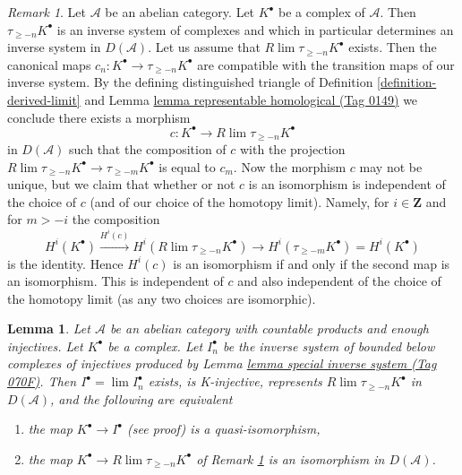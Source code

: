 \documentclass{amsart}
\theoremstyle{plain}
\newtheorem{lemma}[subsection]{Lemma}
\theoremstyle{definition}
\theoremstyle{remark}
\newtheorem{remark}[subsection]{Remark}
\numberwithin{equation}{subsection}
\def\lim{\mathop{\mathrm{lim}}\nolimits}
\begin{document}
\begin{remark}
\label{remark-map-into-derived-limit-truncations}
Let $\mathcal{A}$ be an abelian category. Let $K^\bullet$ be a
complex of $\mathcal{A}$. Then $\tau_{\geq -n}K^\bullet$ is an
inverse system of complexes and which in particular determines
an inverse system in $D(\mathcal{A})$. Let us assume that
$R\lim \tau_{\geq -n}K^\bullet$ exists. Then the canonical maps
$c_n : K^\bullet \to \tau_{\geq -n}K^\bullet$ are compatible with the
transition maps of our inverse system. By the defining distinguished
triangle of Definition \ref{definition-derived-limit} and
Lemma \href{https://stacks.math.columbia.edu/tag/0149}{lemma representable homological (Tag 0149)}
we conclude there exists a morphism
$$
c : K^\bullet \longrightarrow R\lim \tau_{\geq -n}K^\bullet
$$
in $D(\mathcal{A})$ such that the composition of $c$ with the projection
$R\lim \tau_{\geq -n}K^\bullet \to \tau_{\geq -m}K^\bullet$ is equal to $c_m$.
Now the morphism $c$ may not be unique, but we claim that whether or not
$c$ is an isomorphism is independent of the choice of $c$ (and of our choice
of the homotopy limit). Namely, for $i \in \mathbf{Z}$ and for $m > -i$
the composition
$$
H^i(K^\bullet) \xrightarrow{H^i(c)} H^i(R\lim \tau_{\geq -n}K^\bullet)
\to H^i(\tau_{\geq -m}K^\bullet) = H^i(K^\bullet)
$$
is the identity. Hence $H^i(c)$ is an isomorphism if and only if the
second map is an isomorphism. This is independent of $c$ and also
independent of the choice of the homotopy limit (as any two choices
are isomorphic).
\end{remark}

\begin{lemma}
\label{lemma-difficulty-K-injectives}
Let $\mathcal{A}$ be an abelian category with countable products and
enough injectives. Let $K^\bullet$ be a complex. Let $I_n^\bullet$ be
the inverse system of bounded below complexes of injectives produced by
Lemma \href{https://stacks.math.columbia.edu/tag/070F}{lemma special inverse system (Tag 070F)}. Then
$I^\bullet = \lim I_n^\bullet$ exists, is K-injective, represents
$R\lim \tau_{\geq -n}K^\bullet$ in $D(\mathcal{A})$,
and the following are equivalent
\begin{enumerate}
\item the map $K^\bullet \to I^\bullet$ (see proof) is a quasi-isomorphism,
\item the map $K^\bullet \to R\lim \tau_{\geq -n}K^\bullet$
of Remark \ref{remark-map-into-derived-limit-truncations}
is an isomorphism in $D(\mathcal{A})$.
\end{enumerate}
\end{lemma}
\end{document}
